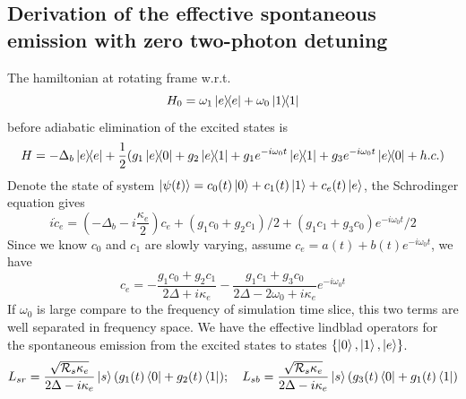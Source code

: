 \documentclass{simple-notes}
\begin{document}
\subsection{Derivation of the effective spontaneous emission with zero two-photon detuning}
The hamiltonian at rotating frame w.r.t.
\begin{equation*}
    H_0 = \omega_1\ketbra{e} + \omega_0\ketbra{1} 
\end{equation*}
before adiabatic elimination of the excited states is
\begin{equation}
    H = -\Delta_b\ketbra{e} + \frac{1}{2}(g_1\ketbra{e}{0} + g_2\ketbra{e}{1} + g_1e^{-i\omega_0 t}\ketbra{e}{1} + g_3e^{-i\omega_0 t}\ketbra{e}{0} + h.c.)
\end{equation}
Denote the state of system $\ket{\psi(t)} = c_0(t)\ket{0} + c_1(t)\ket{1} + c_e(t)\ket{e}$, the Schrodinger equation gives
\begin{equation}
    i \dot c_e = (-\Delta_b - i\frac{\kappa_e}{2})c_e + (g_1 c_0 + g_2 c_1)/2 + (g_1 c_1 + g_3 c_0)e^{-i\omega_0 t}/2
\end{equation}
Since we know $c_0$ and $c_1$ are slowly varying, assume $c_e = a(t) + b(t)e^{-i\omega_0 t}$, we have 
\begin{equation*}
    c_e = -\frac{g_1 c_0 + g_2 c_1}{2\Delta + i\kappa_e} - \frac{g_1 c_1 + g_3 c_0}{2\Delta - 2\omega_0 + i\kappa_e} e^{-i\omega_0 t}
\end{equation*}
If $\omega_0$ is large compare to the frequency of simulation time slice, this two terms are well separated in frequency space. We have the effective lindblad operators for the spontaneous emission from the excited states to states $\{\ket{0}, \ket{1}, \ket{e}\}$.
\begin{equation}
    L_{sr} = \frac{\sqrt{\mathcal{R}_s\kappa_e}}{2\Delta - i\kappa_e}\ket{s}(g_1(t)\bra{0} + g_2(t)\bra{1});\quad L_{sb} = \frac{\sqrt{\mathcal{R}_s\kappa_e}}{2\Delta - i\kappa_e}\ket{s}(g_3(t)\bra{0} + g_1(t)\bra{1})
\end{equation}
\end{document}
